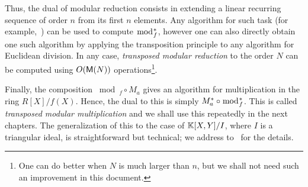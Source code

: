   Thus, the dual of modular reduction
consists in extending a linear recurring sequence of order $n$ from
its first $n$ elements. Any algorithm for such task (for
example,~\cite[$\S$3]{shoup99}) can be used to compute
$\bmod_f^\ast$, however one can also directly obtain one such
algorithm by applying the transposition principle to any algorithm for
Euclidean division. In any case,
\emph{transposed modular
  reduction} to the order $N$ can be computed using $O(\mathsf{M}(N))$
operations\footnote{One can do better when $N$ is much larger than
  $n$, but we shall not need such an improvement in this document.}.

Finally, the composition $\bmod_f\circ M_a$ gives an algorithm for
multiplication in the ring $R[X]/f(X)$. Hence, the dual to this is
simply $M_a^\ast\circ\bmod_f^\ast$. This is called
\emph{transposed modular
  multiplication} and we shall use this repeatedly in the next
chapters. The generalization of this to the case of $\mathbb{K}[X,Y]/I$, where
$I$ is a triangular ideal, is straightforward but technical; we
address to~\cite[Corollary~2]{pascal+schost06} for the details.




